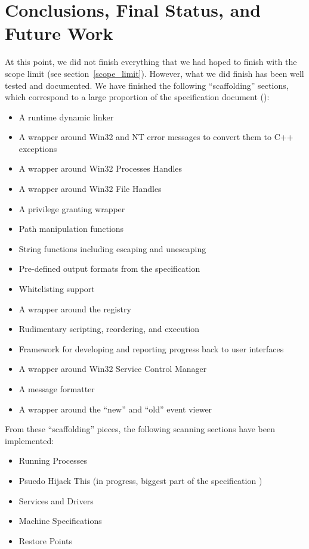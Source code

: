 \documentclass[letterpaper,12pt]{article}
\begin{document}
\newpage



\section{Conclusions, Final Status, and Future Work} \label{conclusions}
At this point, we did not finish everything that we had hoped to finish with the
scope limit (see section~\ref{scope_limit}).  However, what we did finish has
been well tested and documented.  We have finished the following ``scaffolding''
sections, which correspond to a large proportion of the specification document
(\cite{Specification}):
\begin{itemize}
  \item A runtime dynamic linker
  \item A wrapper around Win32 and NT error messages to convert them to C++
  exceptions
  \item A wrapper around Win32 Processes Handles
  \item A wrapper around Win32 File Handles
  \item A privilege granting wrapper
  \item Path manipulation functions
  \item String functions including escaping and unescaping
  \item Pre-defined output formats from the specification
  \item Whitelisting support
  \item A wrapper around the registry
  \item Rudimentary scripting, reordering, and execution
  \item Framework for developing and reporting progress back to user interfaces
  \item A wrapper around Win32 Service Control Manager 
  \item A message formatter
  \item A wrapper around the ``new'' and ``old'' event viewer
\end{itemize}

From these ``scaffolding'' pieces, the following scanning sections have been
implemented:
\begin{itemize}
  \item Running Processes
  \item Psuedo Hijack This (in progress, biggest part of the specification
  \cite{Specification})
  \item Services and Drivers
  \item Machine Specifications
  \item Restore Points
\end{itemize}
\end{document}
